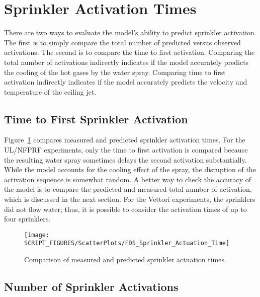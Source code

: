 \clearpage

\section{Sprinkler Activation Times}

There are two ways to evaluate the model's ability to predict sprinkler activation. The first is to simply compare the total number of predicted versus observed activations. The second is to compare the time to first activation. Comparing the total number of activations indirectly indicates if the model accurately predicts the cooling of the hot gases by the water spray. Comparing time to first activation indirectly indicates if the model accurately predicts the velocity and temperature of the ceiling jet.

\subsection{Time to First Sprinkler Activation}

Figure~\ref{Sprinkler_Activation_Times} compares measured and predicted sprinkler activation times. For the UL/NFPRF experiments, only the time to first activation is compared because the resulting water spray sometimes delays the second activation substantially. While the model accounts for the cooling effect of the spray, the disruption of the activation sequence is somewhat random. A better way to check the accuracy of the model is to compare the predicted and measured total number of activation, which is discussed in the next section. For the Vettori experiments, the sprinklers did not flow water; thus, it is possible to consider the activation times of up to four sprinklers.

\begin{figure}[h]
\begin{center}
\texttt{[image: SCRIPT\_FIGURES/ScatterPlots/FDS\_Sprinkler\_Actuation\_Time]}
\end{center}
\caption[Comparison of measured and predicted sprinkler actuation times]{Comparison of measured and predicted sprinkler actuation times.}
\label{Sprinkler_Activation_Times}
\end{figure}


\clearpage

\subsection{Number of Sprinkler Activations}
\label{UL_NFPRF:Results}


